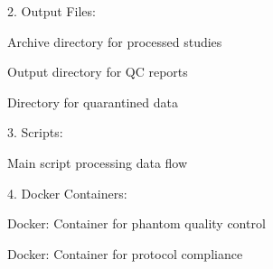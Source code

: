 \documentclass[letterpaper,10pt,english]{sphinxmanual}
\begin{document}
\begin{DUlineblock}{0em}
\item[] 2. Output Files:
\end{DUlineblock}

\begin{DUlineblock}{0em}
\item[] \sphinxhyphen{}  \sphinxhyphen{} Archive directory for processed studies
\item[] \sphinxhyphen{}  \sphinxhyphen{} Output directory for QC reports
\item[] \sphinxhyphen{}  \sphinxhyphen{} Directory for quarantined data
\end{DUlineblock}

\begin{DUlineblock}{0em}
\item[] 3. Scripts:
\end{DUlineblock}

\begin{DUlineblock}{0em}
\item[] \sphinxhyphen{}  \sphinxhyphen{} Main script processing data flow
\end{DUlineblock}

\begin{DUlineblock}{0em}
\item[] 4. Docker Containers:
\end{DUlineblock}

\begin{DUlineblock}{0em}
\item[] \sphinxhyphen{} Docker:  \sphinxhyphen{} Container for phantom quality control
\item[] \sphinxhyphen{} Docker:  \sphinxhyphen{} Container for protocol compliance
\end{DUlineblock}

\sphinxAtStartPar
{}
\end{document}
